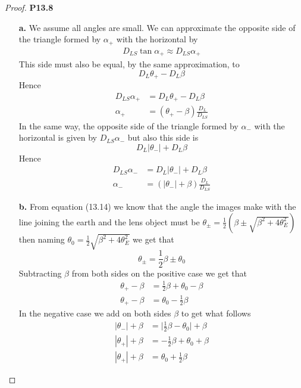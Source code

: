 \documentclass[11pt]{article}
\theoremstyle{definition}
\begin{document}
\cleardoublepage
\begin{proof}{\textbf{P13.8}}
\begin{itemize}
\item [\textbf{a.}] We assume all angles are small. We can approximate the
opposite side of the triangle formed by $\alpha_+$ with the horizontal by
\begin{align*}
    D_{LS}\tan\alpha_+ \approx D_{LS}\alpha_+
\end{align*}
This side must also be equal, by the same approximation, to
$$D_L \theta_+ - D_L \beta$$
Hence
\begin{align*}
    D_{LS}\alpha_+ &= D_L \theta_+ - D_L \beta\\
    \alpha_+ &= (\theta_+ - \beta)\frac{D_L}{D_{LS}}
\end{align*}
In the same way, the opposite side of the triangle formed by $\alpha_-$ with
the horizontal is given by $D_{LS}\alpha_-$ but also this side is
$$D_L |\theta_-| + D_L \beta$$
Hence
\begin{align*}
    D_{LS}\alpha_- &= D_L |\theta_-| + D_L \beta\\
    \alpha_- &= (|\theta_-| + \beta)\frac{D_L}{D_{LS}}
\end{align*}

\item [\textbf{b.}] From equation (13.14) we know that the angle the images
make with the line joining the earth and the lens object must be
$\theta_{\pm} = \frac{1}{2}(\beta \pm \sqrt{\beta^2 + 4\theta_E^2})$
then naming $\theta_0 = \frac{1}{2}\sqrt{\beta^2 + 4\theta_E^2}$ we get that
$$\theta_{\pm} = \frac{1}{2}\beta \pm \theta_0$$
Subtracting $\beta$ from both sides on the positive case we get that
\begin{align*}
    \theta_+ - \beta &= \frac{1}{2}\beta + \theta_0 - \beta\\
    \theta_+ - \beta &= \theta_0 - \frac{1}{2}\beta
\end{align*}
In the negative case we add on both sides $\beta$ to get what follows
\begin{align*}
    |\theta_-| + \beta &= \bigg|\frac{1}{2}\beta - \theta_0\bigg| + \beta\\
    |\theta_+| + \beta &= -\frac{1}{2}\beta + \theta_0 + \beta\\
    |\theta_+| + \beta &= \theta_0 + \frac{1}{2}\beta
\end{align*}


\end{itemize}
\end{proof}
\end{document}
